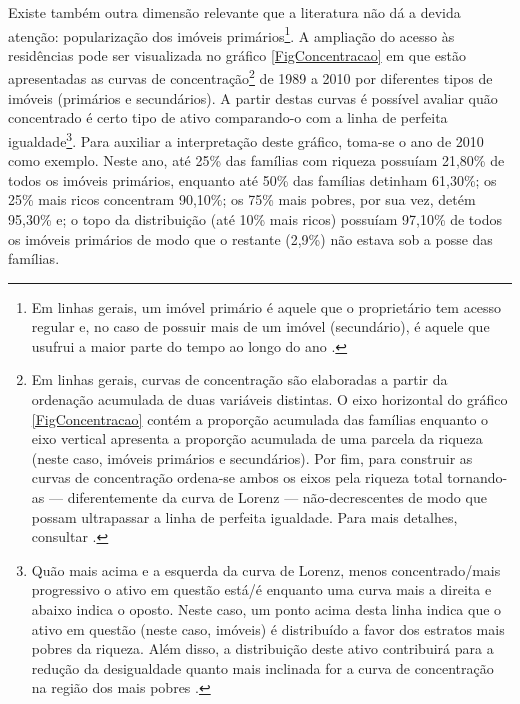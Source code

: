 

Existe também outra dimensão relevante que a literatura não dá a devida atenção: popularização dos imóveis primários\footnote{
	Em linhas gerais, um imóvel primário é aquele que o proprietário tem acesso regular e, no caso de possuir mais de um imóvel (secundário), é aquele que usufrui a maior parte do tempo ao longo do ano \cite{us_census_bureau_characteristics_2017}.
}.
A ampliação do acesso às residências pode ser visualizada no gráfico \ref{FigConcentracao} em que estão apresentadas as curvas de concentração\footnote{
	Em linhas gerais, curvas de concentração são elaboradas a partir da ordenação acumulada de duas variáveis distintas. O eixo horizontal do gráfico \ref{FigConcentracao} contém a proporção acumulada das famílias enquanto o eixo vertical apresenta a proporção acumulada de uma parcela da riqueza (neste caso, imóveis primários e secundários). Por fim, para construir as curvas de concentração ordena-se ambos os eixos pela riqueza total tornando-as --- diferentemente da curva de Lorenz --- não-decrescentes de modo que possam ultrapassar a linha de perfeita igualdade. Para mais detalhes, consultar \textcite[p.~197--201]{hoffmann_distribuicao_2018}.
} de 1989 a 2010 por diferentes tipos de imóveis (primários e secundários).
A partir destas curvas é possível avaliar quão concentrado é certo tipo de ativo comparando-o com a linha de perfeita igualdade\footnote{Quão mais acima e a esquerda da curva de Lorenz, menos concentrado/mais progressivo o ativo em questão está/é enquanto uma curva mais a direita e abaixo indica o oposto.
Neste caso, um ponto acima desta linha indica que o ativo em questão (neste caso, imóveis) é distribuído a favor dos estratos mais pobres da riqueza.
Além disso, a distribuição deste ativo contribuirá para a redução da desigualdade quanto mais inclinada for a curva de concentração na região dos mais pobres \cite[p.~36]{medeiros_uma_2006}.
}.
Para auxiliar a interpretação deste gráfico, toma-se o ano de 2010 como exemplo.
Neste ano, até 25\% das famílias com riqueza possuíam 21,80\% de todos os imóveis primários, enquanto até 50\% das famílias detinham 61,30\%; os 25\% mais ricos concentram 90,10\%; os 75\% mais pobres, por sua vez, detém 95,30\% e; o topo da distribuição (até 10\% mais ricos) possuíam 97,10\% de todos os imóveis primários de modo que o restante (2,9\%) não estava sob a posse das famílias.

